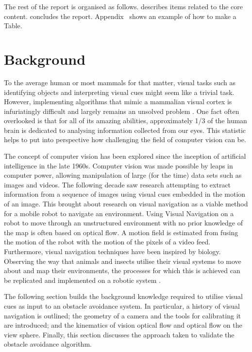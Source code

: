 \documentclass{UoNMCHA}
\numberwithin{equation}{section}
\begin{document}
The rest of the report is organised as follows.  describes items related to the core content.  concludes the report. Appendix~ shows an example of how to make a Table.

\newpage
\section{Background}\label{sec:Background} %
To the average human or most mammals for that matter, visual tasks such as identifying objects and interpreting visual cues might seem like a trivial task. However, implementing algorithms that mimic a mammalian visual cortex is infuriatingly difficult and largely remains an unsolved problem \citep{hartley2003multiple}. One fact often overlooked is that for all of its amazing abilities, approximately 1/3 of the human brain is dedicated to analysing information collected from our eyes. This statistic helps to put into perspective how challenging the field of computer vision can be.

The concept of computer vision has been explored since the inception of artificial intelligence in the late 1960s. Computer vision was made possible by leaps in computer power, allowing manipulation of large (for the time) data sets such as images and videos. The following decade saw research attempting to extract information from a sequence of images using visual cues embedded in the motion of an image. This brought about research on visual navigation as a viable method for a mobile robot to navigate an environment. Using Visual Navigation on a robot to move through an unstructured environment with no prior knowledge of the map is often based on optical flow. A motion field is estimated from fusing the motion of the robot with the motion of the pixels of a video feed. Furthermore, visual navigation techniques have been inspired by biology. Observing the way that animals and insects utilise their visual systems to move about and map their environments, the processes for which this is achieved can be replicated and implemented on a robotic system \citep{altshuler2018comparison}.

The following section builds the background knowledge required to utilise visual cues as input to an obstacle avoidance system. In particular, a history of visual navigation is outlined;  the geometry of a camera and the tools for calibrating it are introduced; and the kinematics of vision optical flow and optical flow on the view sphere. Finally, this section discusses the approach taken to validate the obstacle avoidance algorithm.
\end{document}

